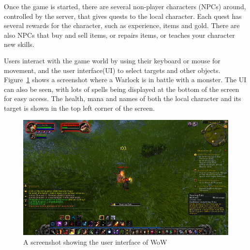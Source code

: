
Once the game is started, there are several non-player characters (NPCs) around, controlled by the server, that gives quests to the local character. Each quest has several rewards for the character, such as experience, items and gold. There are also NPCs that buy and sell items, or repairs items, or teaches your character new skills.

Users interact with the game world by using their keyboard or mouse for movement, and the user interface(UI) to select targets and other objects. %
 Figure~\ref{ui} shows a screenshot where a Warlock is in battle with a monster. The UI can also be seen, with lots of spells being displayed at the bottom of the screen for easy access. The health, mana and names of both the local character and its target is shown in the top left corner of the screen. %

\begin{figure}[htbp]
\centering
\includegraphics[scale = 0.65]{wowscreen.jpg}	
\caption{A screenshot showing the user interface of WoW}
\label{ui}
\end{figure}

